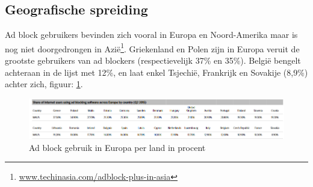\documentclass[pdftex,a4paper,12pt,twoside]{report}
\begin{document}
\subsection{Geografische spreiding}
\label{sec Geografische spreiding}
Ad block gebruikers bevinden zich vooral in Europa en Noord-Amerika maar is nog niet doorgedrongen in Azië\footnote{\url{www.techinasia.com/adblock-plus-in-asia}}.
Griekenland en Polen zijn in Europa veruit de grootste gebruikers van ad blockers (respectievelijk 37\% en 35\%). België bengelt achteraan in de lijst met 12\%, en laat enkel Tsjechië, Frankrijk en Sovakije (8,9\%) achter zich, figuur: \ref{fig: ratespercountry}.
\begin{figure}[h!]
\centering
\includegraphics[width=12cm]{img/ratespercountry}
\caption{Ad block gebruik in Europa per land in procent}
\label{fig: ratespercountry}
\end{figure}
\end{document}
